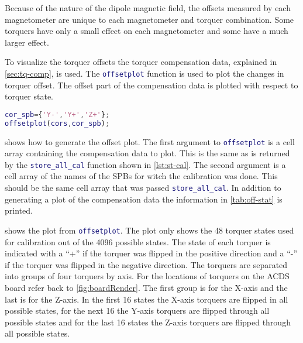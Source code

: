 Because of the nature of the dipole magnetic field, the offsets measured by each magnetometer are unique to each magnetometer and torquer combination. Some torquers have only a small effect on each magnetometer and some have a much larger effect. 

To visualize the torquer offsets the torquer compensation data, explained in \cref{sec:tq-comp}, is used. The \lstinline[style=code,language=Matlab]$offsetplot$ function is used to plot the changes in torquer offset. The offset part of the compensation data is plotted with respect to torquer state.

\begin{lstlisting}[style=code,caption={Plotting torquer offsets from compensation data},label={lst:off-plot},language=Matlab]
cor_spb={'Y-','Y+','Z+'};
offsetplot(cors,cor_spb);
\end{lstlisting}

 shows how to generate the offset plot. The first argument to \lstinline[style=code,language=Matlab]$offsetplot$ is a cell array containing the compensation data to plot. This is the same as is returned by the \lstinline[style=code,language=Matlab]$store_all_cal$ function shown in \cref{lst:st-cal}. The second argument is a cell array of the names of the \acp{SPB} for witch the calibration was done. This should be the same cell array that was passed \lstinline[style=code,language=Matlab]$store_all_cal$. In addition to generating a plot of the compensation data the information in \cref{tab:off-stat} is printed.

 shows the plot from \lstinline[style=code,language=Matlab]$offsetplot$. The plot only shows the 48 torquer states used for calibration out of the 4096 possible states. The state of each torquer is indicated with a ``+'' if the torquer was flipped in the positive direction and a ``-'' if the torquer was flipped in the negative direction. The torquers are separated into groups of four torquers by axis. For the locations of torquers on the \ac{ACDS} board refer back to \cref{fig:boardRender}. The first group is for the X-axis and the last is for the Z-axis. In the first 16 states the X-axis torquers are flipped in all possible states, for the next 16 the Y-axis torquers are flipped through all possible states and for the last 16 states the Z-axis torquers are flipped through all possible states.

